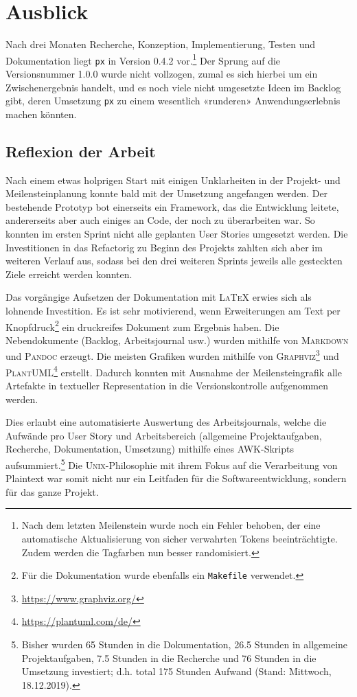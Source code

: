 \section{Ausblick}

Nach drei Monaten Recherche, Konzeption, Implementierung, Testen und Dokumentation liegt \texttt{px} in Version 0.4.2 vor.\footnote{Nach dem letzten Meilenstein wurde noch ein Fehler behoben, der eine automatische Aktualisierung von sicher verwahrten Tokens beeinträchtigte. Zudem werden die Tagfarben nun besser randomisiert.} Der Sprung auf die Versionsnummer 1.0.0 wurde nicht vollzogen, zumal es sich hierbei um ein Zwischenergebnis handelt, und es noch viele nicht umgesetzte Ideen im Backlog gibt, deren Umsetzung \texttt{px} zu einem wesentlich «runderen» Anwendungserlebnis machen könnten.

\subsection{Reflexion der Arbeit}

Nach einem etwas holprigen Start mit einigen Unklarheiten in der Projekt- und Meilensteinplanung konnte bald mit der Umsetzung angefangen werden. Der bestehende Prototyp bot einerseits ein Framework, das die Entwicklung leitete, andererseits aber auch einiges an Code, der noch zu überarbeiten war. So konnten im ersten Sprint nicht alle geplanten User Stories umgesetzt werden. Die Investitionen in das Refactorig zu Beginn des Projekts zahlten sich aber im weiteren Verlauf aus, sodass bei den drei weiteren Sprints jeweils alle gesteckten Ziele erreicht werden konnten.

Das vorgängige Aufsetzen der Dokumentation mit \textsc{LaTeX} erwies sich als lohnende Investition. Es ist sehr motivierend, wenn Erweiterungen am Text per Knopfdruck\footnote{Für die Dokumentation wurde ebenfalls ein \texttt{Makefile} verwendet.} ein druckreifes Dokument zum Ergebnis haben. Die Nebendokumente (Backlog, Arbeitsjournal usw.) wurden mithilfe von \textsc{Markdown} und \textsc{Pandoc} erzeugt. Die meisten Grafiken wurden mithilfe von \textsc{Graphviz}\footnote{\url{https://www.graphviz.org/}} und \textsc{PlantUML}\footnote{\url{https://plantuml.com/de/}} erstellt. Dadurch konnten mit Ausnahme der Meilensteingrafik alle Artefakte in textueller Representation in die Versionskontrolle aufgenommen werden.

Dies erlaubt eine automatisierte Auswertung des Arbeitsjournals, welche die Aufwände pro User Story und Arbeitsbereich (allgemeine Projektaufgaben, Recherche, Dokumentation, Umsetzung) mithilfe eines \textsc{AWK}-Skripts aufsummiert.\footnote{Bisher wurden 65 Stunden in die Dokumentation, 26.5 Stunden in allgemeine Projektaufgaben, 7.5 Stunden in die Recherche und 76 Stunden in die Umsetzung investiert; d.h. total 175 Stunden Aufwand (Stand: Mittwoch, 18.12.2019).} Die \textsc{Unix}-Philoso\-phie mit ihrem Fokus auf die Verarbeitung von Plaintext war somit nicht nur ein Leitfaden für die Softwareentwicklung, sondern für das ganze Projekt.

